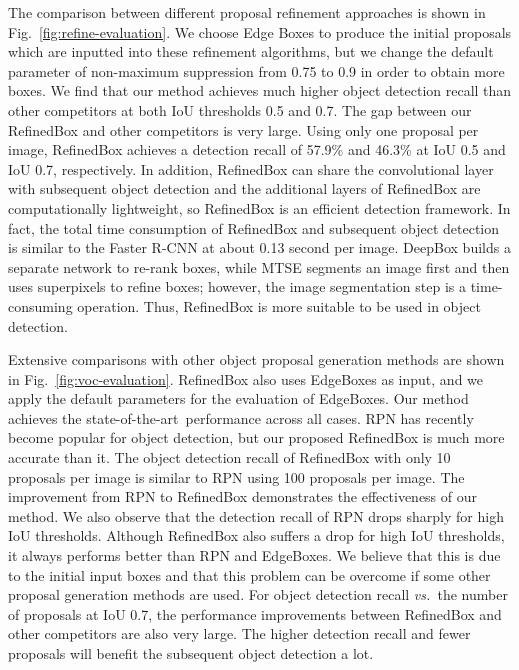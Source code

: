 \documentclass[letterpaper]{article} %
\newcommand{\figref}[1]{Fig.~\ref{#1}}
\def\vs{\emph{vs.~}}
\def\sArt{{state-of-the-art~}}
\begin{document}
The comparison between different proposal refinement approaches is shown
in \figref{fig:refine-evaluation}.
We choose Edge Boxes \cite{zitnick2014edge} to produce the initial proposals
which are inputted into these refinement algorithms, but we change the default
parameter of non-maximum suppression from 0.75 to 0.9 in order to obtain more boxes.
We find that our method achieves much higher object detection recall than other
competitors at both IoU thresholds 0.5 and 0.7.
The gap between our RefinedBox and other competitors is very large.
Using only one proposal per image, RefinedBox achieves a detection recall of
57.9\% and 46.3\% at IoU 0.5 and IoU 0.7, respectively.
In addition, RefinedBox can share the convolutional layer with subsequent object
detection and the additional layers of RefinedBox are computationally lightweight,
so RefinedBox is an efficient detection framework.
In fact, the total time consumption of RefinedBox and subsequent object detection
is similar to the Faster R-CNN \cite{ren2015faster} at about 0.13 second per image.
DeepBox builds a separate network to re-rank boxes,
while MTSE segments an image first and then uses superpixels to refine boxes;
however, the image segmentation step is a time-consuming operation.
Thus, RefinedBox is more suitable to be used in object detection.


Extensive comparisons with other object proposal generation methods
are shown in \figref{fig:voc-evaluation}.
RefinedBox also uses EdgeBoxes as input,
and we apply the default parameters for the evaluation of EdgeBoxes.
Our method achieves the \sArt performance across all cases.
RPN has recently become popular for object detection,
but our proposed RefinedBox is much more accurate than it.
The object detection recall of RefinedBox with only 10 proposals per image
is similar to RPN using 100 proposals per image.
The improvement from RPN to RefinedBox demonstrates the effectiveness of our method.
We also observe that the detection recall of RPN drops sharply for high IoU
thresholds.
Although RefinedBox also suffers a drop for high IoU thresholds,
it always performs better than RPN and EdgeBoxes.
We believe that this is due to the initial input boxes
and that this problem can be overcome if some other proposal generation methods are used.
For object detection recall \vs the number of proposals at IoU 0.7,
the performance improvements between RefinedBox and other competitors are also very large.
The higher detection recall and fewer proposals will benefit the subsequent
object detection a lot.
\end{document}
